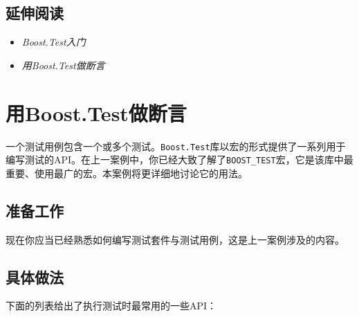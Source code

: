
\subsection{延伸阅读}



\begin{itemize}
\item \textit{Boost.Test入门}



\item \textit{用Boost.Test做断言}

\end{itemize}



\section{用Boost.Test做断言}



一个测试用例包含一个或多个测试。\texttt{Boost.\allowbreak{}Test}库以宏的形式提供了一系列用于编写测试的API。在上一案例中，你已经大致了解了\texttt{BOOST\_\allowbreak{}TEST}宏，它是该库中最重要、使用最广的宏。本案例将更详细地讨论它的用法。



\subsection{准备工作}



现在你应当已经熟悉如何编写测试套件与测试用例，这是上一案例涉及的内容。



\subsection{具体做法}



下面的列表给出了执行测试时最常用的一些API：



